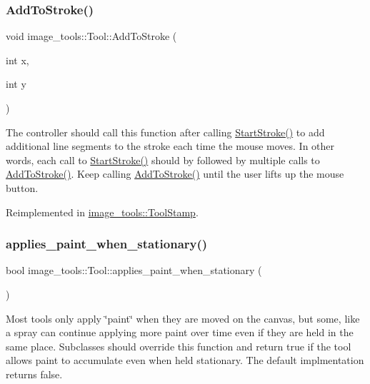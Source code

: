 \subsubsection{\texorpdfstring{Add\+To\+Stroke()}{AddToStroke()}}
{\footnotesize\ttfamily void image\+\_\+tools\+::\+Tool\+::\+Add\+To\+Stroke (\begin{DoxyParamCaption}\item[{int}]{x,  }\item[{int}]{y }\end{DoxyParamCaption})\hspace{0.3cm}{\ttfamily [virtual]}}

The controller should call this function after calling \hyperlink{classimage__tools_1_1Tool_a1b7cd7d59588923d7e29b6150334f5b8}{Start\+Stroke()} to add additional line segments to the stroke each time the mouse moves. In other words, each call to \hyperlink{classimage__tools_1_1Tool_a1b7cd7d59588923d7e29b6150334f5b8}{Start\+Stroke()} should by followed by multiple calls to \hyperlink{classimage__tools_1_1Tool_a84d87d7baec8a961be236d4b30636fc0}{Add\+To\+Stroke()}. Keep calling \hyperlink{classimage__tools_1_1Tool_a84d87d7baec8a961be236d4b30636fc0}{Add\+To\+Stroke()} until the user lifts up the mouse button. 

Reimplemented in \hyperlink{classimage__tools_1_1ToolStamp_a098a342f03717e2f909cda9515c85814}{image\+\_\+tools\+::\+Tool\+Stamp}.

\mbox{\label{classimage__tools_1_1Tool_a84b6d2c885d11cf1990a3c7a1343a05f}} 
\subsubsection{\texorpdfstring{applies\+\_\+paint\+\_\+when\+\_\+stationary()}{applies\_paint\_when\_stationary()}}
{\footnotesize\ttfamily bool image\+\_\+tools\+::\+Tool\+::applies\+\_\+paint\+\_\+when\+\_\+stationary (\begin{DoxyParamCaption}{ }\end{DoxyParamCaption})\hspace{0.3cm}{\ttfamily [virtual]}}

Most tools only apply \char`\"{}paint\char`\"{} when they are moved on the canvas, but some, like a spray can continue applying more paint over time even if they are held in the same place. Subclasses should override this function and return true if the tool allows paint to accumulate even when held stationary. The default implmentation returns false. 

